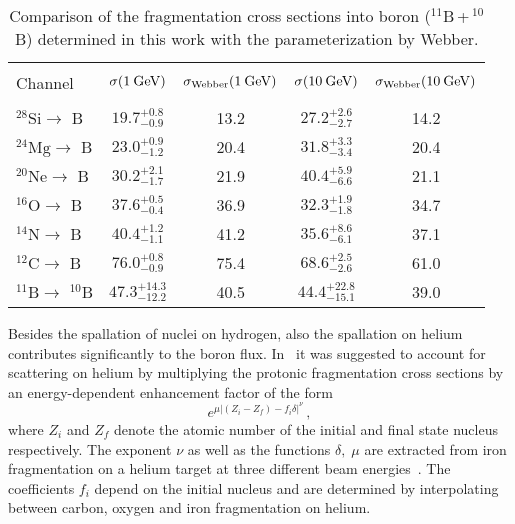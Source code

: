 \documentclass[a4paper,11pt]{article}
\newcommand{\eVdist}{\kern-0.06em}
\newcommand{\gev}{\:\text{Ge\eVdist V}}
\begin{document}
\begin{table}[htp]
\begin{center}
\begin{tabular}{|l|cc|cc|}
\hline
\rowcolor{light-gray}  &   &  &   &  \\[-3mm]
\rowcolor{light-gray}  Channel & $\sigma(1\gev)$ & $\sigma_{\text{Webber}}(1\gev)$ & $\sigma(10\gev)$ & $\sigma_{\text{Webber}}(10\gev)$  \\[2mm]
\hline 
  &   & & &\\[-3mm]
 $^{28}\text{Si}\rightarrow$ $\text{B}$    & $19.7^{+0.8}_{-0.9}$& 13.2 & $27.2^{+2.6}_{-2.7}$ & 14.2 \\[2mm]
 $^{24}\text{Mg}\rightarrow$ $\text{B}$    & $23.0^{+0.9}_{-1.2}$& 20.4 & $31.8^{+3.3}_{-3.4}$ & 20.4 \\[2mm]
 $^{20}\text{Ne}\rightarrow$ $\text{B}$    & $30.2^{+2.1}_{-1.7}$& 21.9 & $40.4^{+5.9}_{-6.6}$ & 21.1 \\[2mm]
 $^{16}\text{O}\rightarrow$ $\text{B}$     & $37.6^{+0.5}_{-0.4}$& 36.9 & $32.3^{+1.9}_{-1.8}$ & 34.7 \\[2mm]
 $^{14}\text{N}\rightarrow$ $\text{B}$     & $40.4^{+1.2}_{-1.1}$& 41.2 & $35.6^{+8.6}_{-6.1}$ & 37.1 \\[2mm]
 $^{12}\text{C}\rightarrow$ $\text{B}$     & $76.0^{+0.8}_{-0.9}$& 75.4 & $68.6^{+2.5}_{-2.6}$ & 61.0 \\[2mm]
 $^{11}\text{B}\rightarrow$ $^{10}\text{B}$& $47.3^{+14.3}_{-12.2}$& 40.5 & $44.4^{+22.8}_{-15.1}$ & 39.0 \\[2mm]
 \hline
\end{tabular}
\end{center}
\caption{Comparison of the fragmentation cross sections into boron ($^{11}\text{B}\,$+$\,^{10}$B) determined in this work with the parameterization by Webber.}
\label{tab:webbercomp}
\end{table}


Besides the spallation of nuclei on hydrogen, also the spallation on helium contributes significantly to the boron flux. In~\cite{Ferrando:1988tw} it was suggested to account for scattering on helium by multiplying the protonic fragmentation cross sections by an energy-dependent enhancement factor of the form
\begin{equation}\label{eq:heliumenhance}
 e^{\mu |(Z_i-Z_f) - f_i \delta|^\nu }\,,
\end{equation}
where $Z_i$ and $Z_f$ denote the atomic number of the initial and final state nucleus respectively. The exponent $\nu$ as well as the functions $\delta,\;\mu$ are extracted from iron fragmentation on a helium target at three different beam energies~\cite{Ferrando:1988tw}. The coefficients $f_i$ depend on the initial nucleus and are determined by interpolating between carbon, oxygen and iron fragmentation on helium.
\end{document}
